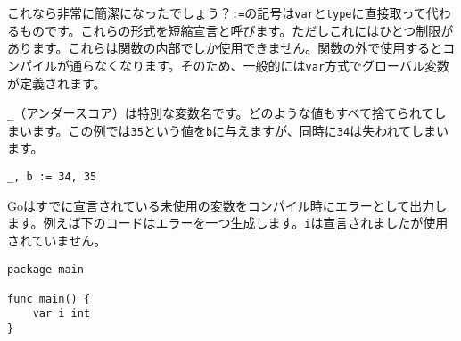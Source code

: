 これなら非常に簡潔になったでしょう？\texttt{:=}の記号は\texttt{var}と\texttt{type}に直接取って代わるものです。これらの形式を短縮宣言と呼びます。ただしこれにはひとつ制限があります。これらは関数の内部でしか使用できません。関数の外で使用するとコンパイルが通らなくなります。そのため、一般的には\texttt{var}方式でグローバル変数が定義されます。

\texttt{\_}（アンダースコア）は特別な変数名です。どのような値もすべて捨てられてしまいます。この例では\texttt{35}という値を\texttt{b}に与えますが、同時に\texttt{34}は失われてしまいます。

\begin{lstlisting}[numbers=none]
_, b := 34, 35
\end{lstlisting}

Goはすでに宣言されている未使用の変数をコンパイル時にエラーとして出力します。例えば下のコードはエラーを一つ生成します。\texttt{i}は宣言されましたが使用されていません。

\begin{lstlisting}[numbers=none]
package main

func main() {
    var i int
}
\end{lstlisting}




